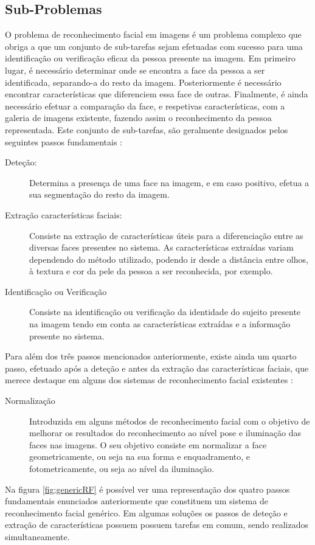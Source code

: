 \subsection{Sub-Problemas} \label{sec:sub-problemas}
O problema de reconhecimento facial em imagens é um problema complexo que obriga a que um conjunto de sub-tarefas sejam efetuadas com sucesso para uma identificação ou verificação eficaz da pessoa presente na imagem. Em primeiro lugar, é necessário determinar onde se encontra a face da pessoa a ser identificada, separando-a do resto da imagem. Posteriormente é necessário encontrar características que diferenciem essa face de outras. Finalmente, é ainda necessário efetuar a comparação da face, e respetivas características, com a galeria de imagens existente, fazendo assim o reconhecimento da pessoa representada. Este conjunto de sub-tarefas, são geralmente designados pelos seguintes passos fundamentais \cite{Zhao2003}:
\begin{description}
\item[Deteção:]
Determina a presença de uma face na imagem, e em caso positivo, efetua a sua segmentação do resto da imagem.

\item[Extração características faciais:]
Consiste na extração de características úteis para a diferenciação entre as diversas faces presentes no sistema. As características extraídas variam dependendo do método utilizado, podendo ir desde a distância entre olhos, à textura e cor da pele da pessoa a ser reconhecida, por exemplo. 

\item[Identificação ou Verificação]
Consiste na identificação ou verificação da identidade do sujeito presente na imagem tendo em conta as características extraídas e a informação presente no sistema.
\end{description}

Para além dos três passos mencionados anteriormente, existe ainda um quarto passo, efetuado após a deteção e antes da extração das características faciais, que merece destaque em alguns dos sistemas de reconhecimento facial existentes \cite{Li2011}:
\begin{description}
\item[Normalização]
Introduzida em alguns métodos de reconhecimento facial com o objetivo de melhorar os resultados do reconhecimento ao nível pose e iluminação das faces nas imagens. O seu objetivo consiste em normalizar a face geometricamente, ou seja na sua forma e enquadramento, e fotometricamente, ou seja ao nível da iluminação.
\end{description}
Na figura \ref{fig:genericRF} é possível ver uma representação dos quatro passos fundamentais enunciados anteriormente que constituem um sistema de reconhecimento facial genérico. Em algumas soluções os passos de deteção e extração de características possuem possuem tarefas em comum, sendo realizados simultaneamente.

